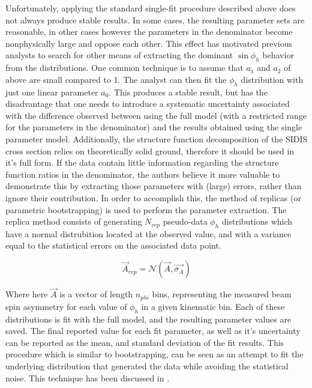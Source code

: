 Unfortunately, applying the standard single-fit procedure described above does not always produce stable results.  In some cases, the resulting parameter sets are reasonable, in other cases however the parameters in the denominator become nonphysically large and oppose each other.  This effect has motivated previous analysts to search for other means of extracting the dominant $\sin\phi_h$ behavior from the distributions.  One common technique is to assume that $a_1$ and $a_2$ of above are small compared to 1.  The analyst can then fit the $\phi_h$ distribution with just one linear parameter $a_0$.  This produces a stable result, but has the disadvantage that one needs to introduce a systematic uncertainty associated with the difference observed between using the full model (with a restricted range for the parameters in the denominator) and the results obtained using the single parameter model.  Additionally, the structure function decomposition of the SIDIS cross section relies on theoretically solid ground, therefore it should be used in it's full form.  If the data contain little information regarding the structure function ratios in the denominator, the authors believe it more valuable to demonstrate this by extracting those parameters with (large) errors, rather than ignore their contribution.  In order to accomplish this, the method of replicas (or parametric bootstrapping) is used to perform the parameter extraction.  The replica method consists of generating $N_{rep}$ pseudo-data $\phi_h$ distributions which have a normal distrubition located at the observed value, and with a variance equal to the statistical errors on the associated data point.  

\begin{equation}
  \vec{A}_{rep} = \mathcal{N}(\vec{A}, \vec{\sigma_{A}})
\end{equation}

Where here $\vec{A}$ is a vector of length $n_{phi}$ bins, representing the measured beam spin asymmetry for each value of $\phi_h$ in a given kinematic bin.  Each of these distributions is fit with the full model, and the resulting parameter values are saved.  The final reported value for each fit parameter, as well as it's uncertainty can be reported as the mean, and standard deviation of the fit results.  This procedure which is similar to bootstrapping, can be seen as an attempt to fit the underlying distribution that generated the data while avoiding the statistical noise.  This technique has been discussed in \cite{computing-watt:2012}.

